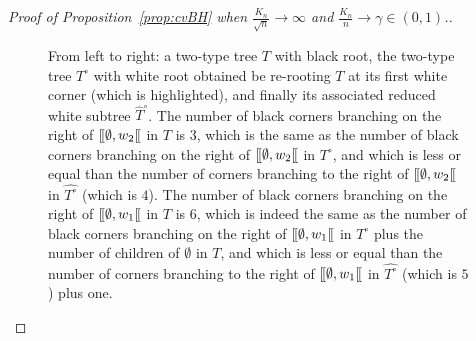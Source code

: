 \documentclass[10pt]{amsart}
\theoremstyle{definition}\newtheorem{defi}[theo]{Definition}\newtheorem{rema}[theo]{Remark}\newtheorem{exam}[theo]{Example}\newtheorem{exem}[theo]{Example}\newtheorem{nota}[theo]{Notation}
\def\llbracket{[\hspace{-.10em} [ }
\begin{document}
\begin{proof}[Proof of  Proposition~\ref{prop:cvBH}  when $\tfrac{K_{n}}{\sqrt{n}} \rightarrow \infty$ and $ \tfrac{K_{n}}{n}  \rightarrow \gamma \in (0,1)$.]
\begin{figure}[t]
\begin{scriptsize}
\end{scriptsize}
\caption{From left to right: a two-type tree $T$ with black root, the two-type tree $T^{\circ}$ with white root obtained be re-rooting $T$ at its first white corner (which is highlighted), and finally its associated reduced white subtree $\hat{T}^{\circ}$. The  number of black corners branching on the right of $\llbracket \emptyset, w_{2} \llbracket$ in $T$ is $3$, which is   the same as the number of black corners branching on the right of $\llbracket \emptyset, w_{2} \llbracket$ in $T^{\circ}$, and which is less or equal than the number of corners branching to the right of $\llbracket \emptyset, w_{2} \llbracket$ in $\hat{T^{\circ}}$ (which is $4$).  The  number of black corners branching on the right of $\llbracket \emptyset, w_{1} \llbracket$ in $T$ is $6$, which is indeed  the same as the number of black corners branching on the right of $\llbracket \emptyset, w_{1} \llbracket$ in $T^{\circ}$ plus the number of children of $\emptyset$ in $T$, and which is less or equal than the number of corners branching to the right of $\llbracket \emptyset, w_{1} \llbracket$ in $\hat{T^{\circ}}$ (which is $5$) plus one.
}
\label{fig:whiteblack}
\end{figure}



\end{proof}
\end{document}
